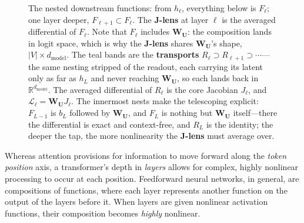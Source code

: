\documentclass{article}
\newcommand{\jlens}{\mathscr{L}}
\newcommand{\dmodel}{d_{\text{model}}}
\begin{document}
\begin{figure}[htbp]
{}
\caption{The nested downstream functions: from $h_\ell$, everything below is $F_\ell$; one layer deeper, $F_{\ell+1}\subset F_\ell$. The \textbf{J-lens} at layer $\ell$ is the averaged differential of $F_\ell$. Note that $F_\ell$ includes $\mathbf{W_U}$: the composition lands in logit space, which is why the \textbf{J-lens} shares $\mathbf{W_U}$'s shape, $|V| \times \dmodel$. The teal bands are the \textbf{transports} $R_\ell \supset R_{\ell+1} \supset \cdots$---the same nesting stripped of the readout, each carrying its latent only as far as $h_L$ and never reaching $\mathbf{W_U}$, so each lands back in $\mathbb{R}^{\dmodel}$. The averaged differential of $R_\ell$ is the core Jacobian $J_\ell$, and $\jlens_\ell = \mathbf{W_U} J_\ell$. The innermost nests make the telescoping explicit: $F_{L-1}$ is $b_L$ followed by $\mathbf{W_U}$, and $F_L$ is nothing but $\mathbf{W_U}$ itself---there the differential is exact and context-free, and $R_L$ is the identity; the deeper the tap, the more nonlinearity the \textbf{J-lens} must average over.}
\label{fig:f-nesting}
\end{figure}


Whereas attention provisions for information to move forward along the \textit{token position} axis, a transformer's depth in \textit{layers} allows for complex, highly nonlinear processing to occur at each position. Feedforward neural networks, in general, are compositions of functions, where each layer represents another function on the output of the layers before it. When layers are given nonlinear activation functions, their composition becomes \textit{highly} nonlinear. 
\end{document}
